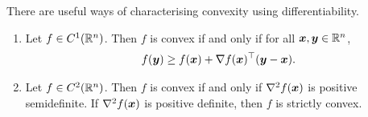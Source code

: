 There are useful ways of characterising convexity using differentiability.
\begin{theorem}
\begin{enumerate}
 \item Let $f\in C^1(\mathbb{R}^n)$. Then $f$ is convex if and only if for all $\bm{x}, \bm{y}\in \mathbb{R}^n$,
 \begin{equation*}
  f(\bm{y})\geq f(\bm{x})+\nabla f(\bm{x})^{\top} (\bm{y}-\bm{x}).
 \end{equation*}
 \item Let $f\in C^2(\mathbb{R}^n)$. Then $f$ is convex if and only if $\nabla^2 f(\bm{x})$ is positive semidefinite. If $\nabla^2f(\bm{x})$ is positive definite, then $f$ is strictly convex.
 \end{enumerate}
\end{theorem}

